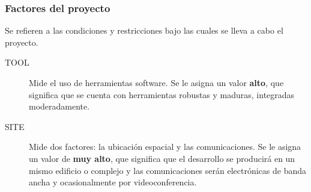 \documentclass[11pt,a4paper,spanish,twoside]{book}
\begin{document}
\subsubsection{Factores del proyecto}
Se refieren a las condiciones y restricciones bajo las cuales se lleva a cabo
el proyecto.
\begin{description}
\item[TOOL] Mide el uso de herramientas software. Se le asigna un valor
\textbf{alto}, que significa que se cuenta con herramientas robustas y
maduras, integradas moderadamente.
\item[SITE] Mide dos factores: la ubicación espacial y las comunicaciones.
Se le asigna un valor de \textbf{muy alto}, que significa que el desarrollo
se producirá en un mismo edificio o complejo y las comunicaciones serán
electrónicas de banda ancha y ocasionalmente por videoconferencia.
\end{description}
\end{document}
